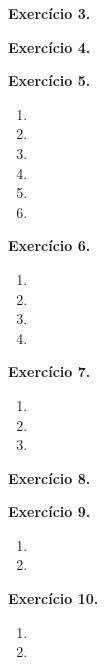 \documentclass[12pt,a4paper]{article}
\begin{document}
\vspace{0.5cm}
\noindent\textbf{Exercício 3.}

\vspace{0.5cm}
\noindent\textbf{Exercício 4.}

\vspace{0.5cm}
\noindent\textbf{Exercício 5.}
\begin{enumerate}
    \renewcommand{\theenumi}{\alph{enumi}}
    \renewcommand{\labelenumi}{\theenumi)}
    \item 
    \item 
    \item 
    \item 
    \item 
    \item 
\end{enumerate}

\vspace{0.5cm}
\noindent\textbf{Exercício 6.}
\begin{enumerate}
    \renewcommand{\theenumi}{\alph{enumi}}
    \renewcommand{\labelenumi}{\theenumi)}
    \item 
    \item 
    \item 
    \item 
\end{enumerate}

\vspace{0.5cm}
\noindent\textbf{Exercício 7.}
\begin{enumerate}
    \renewcommand{\theenumi}{\alph{enumi}}
    \renewcommand{\labelenumi}{\theenumi)}
    \item 
    \item 
    \item 
\end{enumerate}

\vspace{0.5cm}
\noindent\textbf{Exercício 8.}

\vspace{0.5cm}
\noindent\textbf{Exercício 9.}
\begin{enumerate}
    \renewcommand{\theenumi}{\alph{enumi}}
    \renewcommand{\labelenumi}{\theenumi)}
    \item 
    \item 
\end{enumerate}

\vspace{0.5cm}
\noindent\textbf{Exercício 10.}
\begin{enumerate}
    \renewcommand{\theenumi}{\alph{enumi}}
    \renewcommand{\labelenumi}{\theenumi)}
    \item 
    \item 
\end{enumerate}
\end{document}
